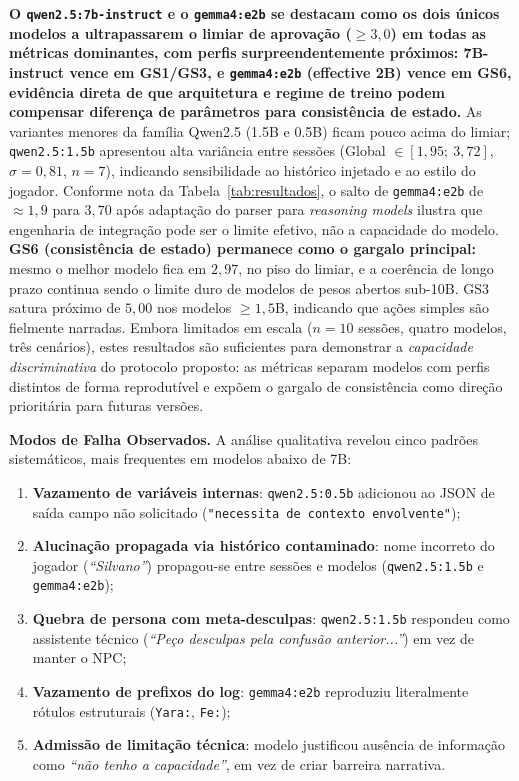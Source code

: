 \documentclass[12pt]{article}
\begin{document}
\textbf{O \texttt{qwen2.5:7b-instruct} e o \texttt{gemma4:e2b} se destacam como os dois únicos modelos a ultrapassarem o limiar de aprovação ($\geq 3{,}0$) em todas as métricas dominantes, com perfis surpreendentemente próximos: 7B-instruct vence em GS1/GS3, e \texttt{gemma4:e2b} (effective 2B) vence em GS6, evidência direta de que arquitetura e regime de treino podem compensar diferença de parâmetros para consistência de estado.} As variantes menores da família Qwen2.5 (1.5B e 0.5B) ficam pouco acima do limiar; \texttt{qwen2.5:1.5b} apresentou alta variância entre sessões (Global $\in [1{,}95;~3{,}72]$, $\sigma=0{,}81$, $n=7$), indicando sensibilidade ao histórico injetado e ao estilo do jogador. Conforme nota da Tabela~\ref{tab:resultados}, o salto de \texttt{gemma4:e2b} de $\approx 1{,}9$ para $3{,}70$ após adaptação do parser para \textit{reasoning models} ilustra que engenharia de integração pode ser o limite efetivo, não a capacidade do modelo. \textbf{GS6 (consistência de estado) permanece como o gargalo principal:} mesmo o melhor modelo fica em $2{,}97$, no piso do limiar, e a coerência de longo prazo continua sendo o limite duro de modelos de pesos abertos sub-10B. GS3 satura próximo de $5{,}00$ nos modelos $\geq 1{,}5$B, indicando que ações simples são fielmente narradas. Embora limitados em escala ($n=10$ sessões, quatro modelos, três cenários), estes resultados são suficientes para demonstrar a \textit{capacidade discriminativa} do protocolo proposto: as métricas separam modelos com perfis distintos de forma reprodutível e expõem o gargalo de consistência como direção prioritária para futuras versões.

\textbf{Modos de Falha Observados.} A análise qualitativa revelou cinco padrões sistemáticos, mais frequentes em modelos abaixo de 7B:

\begin{enumerate}[label=(\roman*),leftmargin=2.4em,itemsep=2pt]
  \item \textbf{Vazamento de variáveis internas}: \texttt{qwen2.5:0.5b} adicionou ao JSON de saída campo não solicitado (\texttt{"necessita de contexto envolvente"});
  \item \textbf{Alucinação propagada via histórico contaminado}: nome incorreto do jogador (\textit{``Silvano''}) propagou-se entre sessões e modelos (\texttt{qwen2.5:1.5b} e \texttt{gemma4:e2b});
  \item \textbf{Quebra de persona com meta-desculpas}: \texttt{qwen2.5:1.5b} respondeu como assistente técnico (\textit{``Peço desculpas pela confusão anterior...''}) em vez de manter o NPC;
  \item \textbf{Vazamento de prefixos do log}: \texttt{gemma4:e2b} reproduziu literalmente rótulos estruturais (\texttt{Yara:}, \texttt{Fe:});
  \item \textbf{Admissão de limitação técnica}: modelo justificou ausência de informação como \textit{``não tenho a capacidade''}, em vez de criar barreira narrativa.
\end{enumerate}
\end{document}
